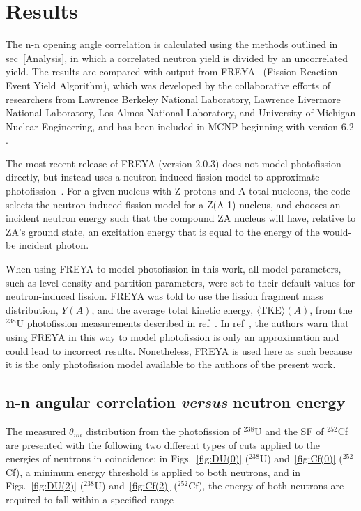 \documentclass[%
 reprint,
 amsmath,amssymb,
 aps,
 nofootinbib
]{revtex4-1}
\begin{document}
\section{Results}
The n-n opening angle correlation is calculated using the methods outlined in sec~\ref{Analysis}, in which a correlated neutron yield is divided by an uncorrelated yield.
The results are compared with output from FREYA~\cite{FREYA} (Fission Reaction Event Yield Algorithm), which was developed by the collaborative efforts of researchers from Lawrence Berkeley National Laboratory,  Lawrence Livermore National Laboratory, Los Almos National Laboratory, and University of Michigan Nuclear Engineering, and has been included in MCNP beginning with version 6.2 .
 
The most recent release of FREYA (version 2.0.3) does not model photofission directly, but instead uses a neutron-induced fission model to approximate photofission~\cite{FREYA_photofission}.
For a given nucleus with Z protons and A total nucleons, the code selects the neutron-induced fission model for a Z(A-1) nucleus, and chooses an incident neutron energy such that the compound ZA nucleus will have, relative to ZA's ground state, an excitation energy that is equal to the energy of the would-be incident photon.

When using FREYA to model photofission in this work, all model parameters, such as level density and partition parameters, were set to their default values for neutron-induced fission.
FREYA was told to use the fission fragment mass distribution, $Y(A)$, and the average total kinetic energy, $\langle$TKE$\rangle(A)$, from the $^{238}$U photofission measurements described in ref~\cite{2017Krishichayan}.
In ref~\cite{Talou2018}, the authors warn that using FREYA in this way to model photofission is only an approximation and could lead to incorrect results.
Nonetheless, FREYA is used here as such because it is the only photofission model available to the authors of the present work.

\subsection{n-n angular correlation \emph{versus} neutron energy}
The measured $\theta_{nn}$ distribution from the photofission of $^{238}$U and the SF of $^{252}$Cf are presented with the following two different types of cuts applied to the energies of neutrons in coincidence:
in Figs.~\ref{fig:DU(0)} ($^{238}$U) and~\ref{fig:Cf(0)} ($^{252}$Cf), a minimum energy threshold is applied to both neutrons, and in Figs.~\ref{fig:DU(2)} ($^{238}$U) and~\ref{fig:Cf(2)} ($^{252}$Cf), the energy of both neutrons are required to fall within a specified range
\end{document}
